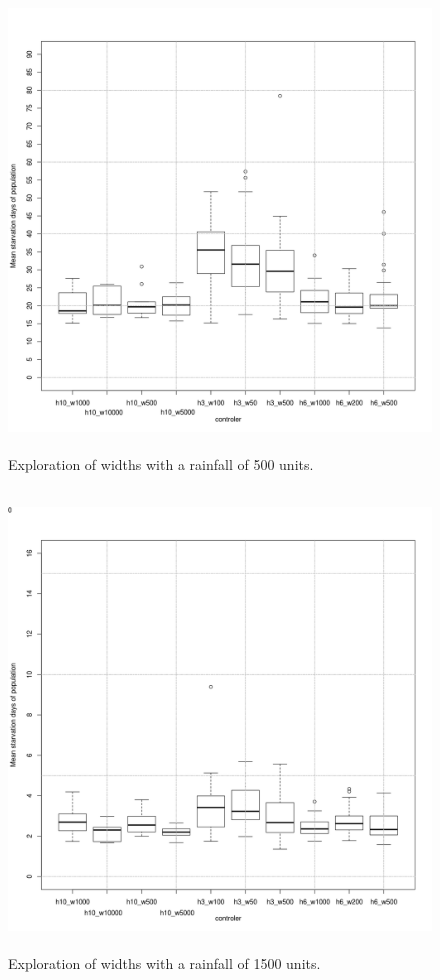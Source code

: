 \documentclass[11pt,oneside,a4paper,openright]{report}
\begin{document}
\begin{figure}[!htb]
\centering
\includegraphics[height=12.2cm]{figures/expm/ecsi3_clim500}
\caption{Exploration of widths with a rainfall of 500 units.}
\label{fig:ecsi3_clim500}
\end{figure}

\begin{figure}[!htb]
\centering
\includegraphics[height=12.2cm]{figures/expm/ecsi3_clim1500}
\caption{Exploration of widths with a rainfall of 1500 units.}
\label{fig:ecsi3_clim1500}
\end{figure}
\end{document}
